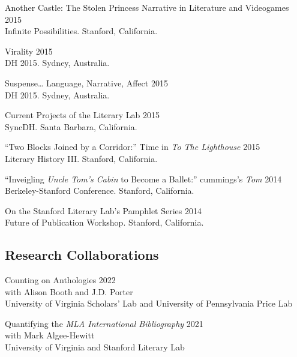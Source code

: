\documentclass[
  12pt,
  letterpaper,
]{article}
\begin{document}
Another Castle: The Stolen Princess Narrative in Literature and
Videogames \hfill 2015\\
\hspace*{0.333em} Infinite Possibilities. Stanford, California.

Virality \hfill 2015\\
\hspace*{0.333em} DH 2015. Sydney, Australia.

Suspense\ldots{} Language, Narrative, Affect \hfill 2015\\
\hspace*{0.333em} DH 2015. Sydney, Australia.

Current Projects of the Literary Lab \hfill 2015\\
\hspace*{0.333em} SyncDH. Santa Barbara, California.

``Two Blocks Joined by a Corridor:'' Time in \emph{To The Lighthouse}
\hfill 2015\\
\hspace*{0.333em} Literary History III. Stanford, California.

``Inveigling \emph{Uncle Tom's Cabin} to Become a Ballet:'' cummings's
\emph{Tom} \hfill 2014\\
\hspace*{0.333em} Berkeley-Stanford Conference. Stanford, California.

On the Stanford Literary Lab's Pamphlet Series \hfill 2014\\
\hspace*{0.333em} Future of Publication Workshop. Stanford, California.

\hypertarget{research-collaborations}{%
\subsection{Research Collaborations}\label{research-collaborations}}

Counting on Anthologies \hfill 2022\\
\hspace*{0.333em} with Alison Booth and J.D. Porter\\
\hspace*{0.333em} University of Virginia Scholars' Lab and University of
Pennsylvania Price Lab

Quantifying the \emph{MLA International Bibliography} \hfill 2021\\
\hspace*{0.333em} with Mark Algee-Hewitt\\
\hspace*{0.333em} University of Virginia and Stanford Literary Lab
\end{document}
